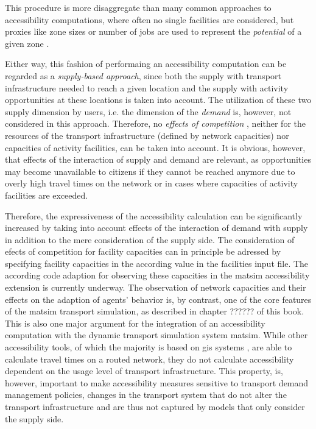 This procedure is more disaggregate than many common approaches to accessibility computations, where often no single facilities
are considered, but proxies like zone sizes or number of jobs are used to represent the \textit{potential} of a given zone
\citep{BuettnerEtAl2010Erreichbarkeitsatlas, GulhanEtAl2014PotentialAccessibilityMeasureDenizli}.

Either way, this fashion of performaing an accessibility computation can be regarded as a \textit{supply-based approach}, since 
both the supply with transport infrastructure needed to reach a given location and the supply with activity opportunities at
these locations is taken into account. The utilization of these two supply dimension by users, i.e. the dimension of 
the \textit{demand} is, however, not considered in this approach. Therefore, no \textit{effects of competition} \citep{Geurs2004AccessibilityReview}, neither for the resources of the transport infrastructure (defined by network 
capacities) nor capacities of activity facilities, can be taken into account. It is obvious, however, that effects of the 
interaction of supply and demand are relevant, as opportunities may become unavailable to citizens if they cannot be reached 
anymore due to overly high travel times on the network or in cases where capacities of activity facilities are exceeded. 

Therefore, the expressiveness of the accessibility calculation can be significantly increased by taking into account 
effects of the interaction of demand with supply in addition to the mere consideration of the supply side. The consideration
of efects of competition for facility capacities can in 
principle be adressed by specifying facility capacities in the according value in the facilities 
input file. The according code adaption for observing these capacities in the \gls{matsim} 
accessibility extension is currently underway. The observation of network capacities and 
their effects on the adaption of agents' behavior is, by contrast, one of the core features of the \gls{matsim} transport 
simulation, as described in chapter ?????? of this book. This is also one major argument for the integration of an 
accessibility computation with the dynamic transport simulation system \gls{matsim}. While other accessibility tools, of 
which the majority is based on \gls{gis} systems
\citep{BBSR20xxErreichbarkeitsmodell, CurtisEtAl2013AccessibilityPolicyInnovation, BuettnerEtAl2010Erreichbarkeitsatlas, LiuZhu2004AccessibilityAnalyst, GulhanEtAl2014PotentialAccessibilityMeasureDenizli}, are able to calculate travel times on a routed network, 
they do not calculate accessibility dependent on the usage level of transport infrastructure. This property, is, however,
important to make accessibility measures sensitive to transport demand management policies, \ie changes in the transport
system that do not alter the transport infrastructure and are thus not captured by models that only consider the supply side.

